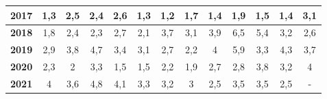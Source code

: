 \begin{center}
\begin{scriptsize}
\begin{longtable}{|c|c|c|c|c|c|c|c|c|c|c|c|c|}
\hline 
\textbf{2017} & 1,3 & 2,5 & 2,4 & 2,6 & 1,3 & 1,2 & 1,7 & 1,4 & 1,9 & 1,5 & 1,4 & 3,1  \\ 
\hline 
\textbf{2018} & 1,8 & 2,4 & 2,3 & 2,7 & 2,1 & 3,7 & 3,1 & 3,9 & 6,5 & 5,4 & 3,2 & 2,6  \\ 
\hline 
\textbf{2019} & 2,9 & 3,8 & 4,7 & 3,4 & 3,1 & 2,7 & 2,2 & 4 & 5,9 & 3,3 & 4,3 & 3,7  \\ 
\hline 
\textbf{2020} & 2,3 & 2 & 3,3 & 1,5 & 1,5 & 2,2 & 1,9 & 2,7 & 2,8 & 3,8 & 3,2 & 4  \\ 
\hline
\textbf{2021} & 4 & 3,6 & 4,8 & 4,1 & 3,3 & 3,2 & 3 & 2,5 & 3,5 & 3,5 & 2,5 & - \\ 
\hline
\end{longtable} 
\end{scriptsize}
\end{center}